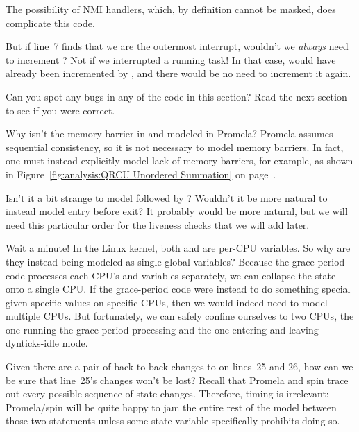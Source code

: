 	The possibility of NMI handlers, which, by definition cannot
	be masked, does complicate this code.

\QuickQ{}
	But if line~7 finds that we are the outermost interrupt,
	wouldn't we \emph{always} need to increment
	?
\QuickA{}
	Not if we interrupted a running task!
	In that case,  would
	have already been incremented by ,
	and there would be no need to increment it again.

\QuickQ{}
	Can you spot any bugs in any of the code in this section?
\QuickA{}
	Read the next section to see if you were correct.

\QuickQ{}
	Why isn't the memory barrier in 
	and  modeled in Promela?
\QuickA{}
	Promela assumes sequential consistency, so
	it is not necessary to model memory barriers.
	In fact, one must instead explicitly model lack of memory barriers,
	for example, as shown in
	Figure~\ref{fig:analysis:QRCU Unordered Summation} on
	page~\pageref{fig:analysis:QRCU Unordered Summation}.

\QuickQ{}
	Isn't it a bit strange to model 
	followed by ?
	Wouldn't it be more natural to instead model entry before exit?
\QuickA{}
	It probably would be more natural, but we will need
	this particular order for the liveness checks that we will add later.

\QuickQ{}
	Wait a minute!
	In the Linux kernel, both  and
	 are per-CPU variables.
	So why are they instead being modeled as single global variables?
\QuickA{}
	Because the grace-period code processes each
	CPU's  and
	 variables separately,
	we can collapse the state onto a single CPU.
	If the grace-period code were instead to do something special
	given specific values on specific CPUs, then we would indeed need
	to model multiple CPUs.
	But fortunately, we can safely confine ourselves to two CPUs, the
	one running the grace-period processing and the one entering and
	leaving dynticks-idle mode.

\QuickQ{}
	Given there are a pair of back-to-back changes to
	 on lines~25 and 26,
	how can we be sure that line~25's changes won't be lost?
\QuickA{}
	Recall that Promela and spin trace out
	every possible sequence of state changes.
	Therefore, timing is irrelevant: Promela/spin will be quite
	happy to jam the entire rest of the model between those two
	statements unless some state variable specifically prohibits
	doing so.

